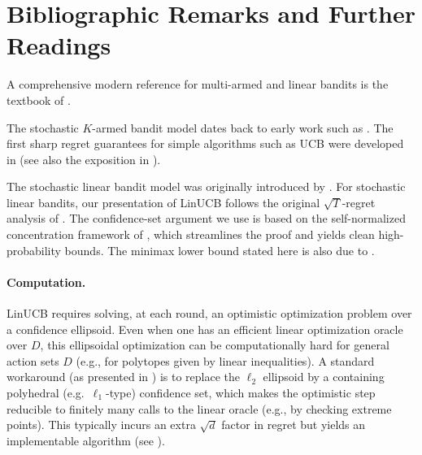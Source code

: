 \section{Bibliographic Remarks and Further Readings}\label{bib:bandits}

A comprehensive modern reference for multi-armed and linear bandits is the
textbook of \citet{lattimore2020bandit}.

The stochastic $K$-armed bandit model dates back to early work such as
\citet{Rob52}. The first sharp regret guarantees for simple algorithms such as
UCB were developed in \citet{Auer02} (see also the exposition in
\citet{lattimore2020bandit}).


The stochastic linear bandit model was originally introduced by \citet{abelong}.
For stochastic linear bandits, our presentation of LinUCB follows the original
$\sqrt{T}$-regret analysis of \citet{dani2008stochastic}. The confidence-set argument we use is
based on the self-normalized concentration framework of
\citet{abbasi2011improved}, which streamlines the proof and yields clean
high-probability bounds. The minimax lower bound stated here is also due to
\citet{dani2008stochastic}.

\paragraph{Computation.}
LinUCB requires solving, at each round, an optimistic optimization problem over
a confidence ellipsoid. Even when one has an efficient linear optimization
oracle over $D$, this ellipsoidal optimization can be computationally hard for
general action sets $D$ (e.g., for polytopes given by linear inequalities).
A standard workaround (as presented in \citet{dani2008stochastic}) is to replace the $\ell_2$ ellipsoid by a containing
polyhedral (e.g.\ $\ell_1$-type) confidence set, which makes the optimistic step
reducible to finitely many calls to the linear oracle (e.g., by checking
extreme points). This typically incurs an extra $\sqrt{d}$ factor in regret but
yields an implementable algorithm (see \citet{dani2008stochastic,lattimore2020bandit}).

